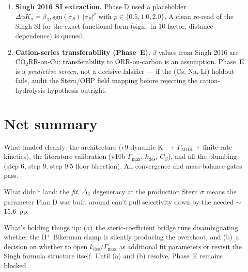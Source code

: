 \documentclass[11pt]{article}
\begin{document}
\begin{enumerate}
\item \textbf{Singh 2016 SI extraction.}  Phase D used a placeholder
  $\Delta\mathrm{p}K_a = \beta_M\,\mathrm{sgn}(\sigma_S)\,|\sigma_S|^p$
  with $p \in \{0.5, 1.0, 2.0\}$.  A clean re-read of the Singh SI
  for the exact functional form (sign, $\ln 10$ factor, distance
  dependence) is queued.

\item \textbf{Cation-series transferability (Phase~E).}  $\beta$
  values from Singh 2016 are CO$_2$RR-on-Cu; transferability to
  ORR-on-carbon is an assumption.  Phase~E is a \emph{predictive
  screen}, not a decisive falsifier --- if the (Cs, Na, Li) holdout
  fails, audit the Stern/OHP field mapping before rejecting the
  cation-hydrolysis hypothesis outright.

\end{enumerate}

\section*{Net summary}

What landed cleanly: the architecture (v9 dynamic K$^+$ +
$\Gamma_{\mathrm{MOH}}$ + finite-rate kinetics), the literature
calibration (v10b $\Gamma_{\mathrm{max}}$, $k_{\mathrm{des}}$,
$C_S$), and all the plumbing (step 6, step 9, step 9.5 floor
bisection).  All convergence and mass-balance gates pass.

What didn't land: the \emph{fit}.  $\Delta_\beta$ degeneracy at the
production Stern $\sigma$ means the parameter Plan D was built around
can't pull selectivity down by the needed $\sim$15.6~pp.

What's holding things up: (a)~the steric-coefficient bridge runs
disambiguating whether the H$^+$ Bikerman clamp is silently
producing the overshoot, and (b)~a decision on whether to open
$k_{\mathrm{des}}$/$\Gamma_{\mathrm{max}}$ as additional fit
parameters or revisit the Singh formula structure itself.  Until
(a) and (b) resolve, Phase~E remains blocked.
\end{document}
